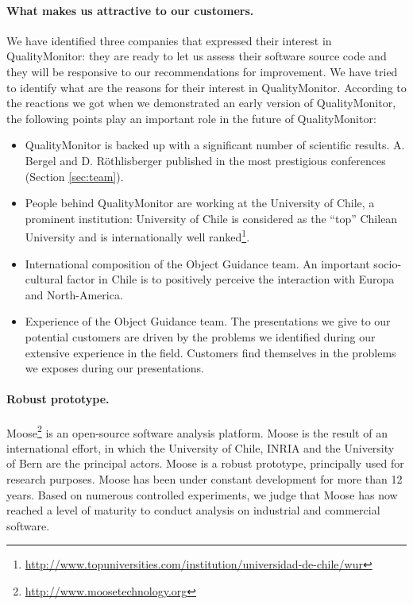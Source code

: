 \documentclass[runningheads]{llncs}
\newcommand{\secref}[1]{Section \ref{sec:#1}}
\begin{document}
\paragraph{What makes us attractive to our customers. }
We have identified three companies that expressed their interest in QualityMonitor: they are ready to let us assess their software source code and they will be responsive to our recommendations for improvement. 
We have tried to identify what are the reasons for their interest in QualityMonitor. According to the reactions we got when we demonstrated an early version of QualityMonitor, the following points play an important role in the future of QualityMonitor:
\begin{itemize}
\item QualityMonitor is backed up with a significant number of scientific results. A. Bergel and D. R\"othlisberger published in the most prestigious conferences (\secref{team}).
\item People behind QualityMonitor are working at the University of Chile, a prominent institution: University of Chile is considered as the ``top'' Chilean University and is internationally well ranked\footnote{\url{http://www.topuniversities.com/institution/universidad-de-chile/wur}}.
\item International composition of the Object Guidance team. An important socio-cultural factor in Chile is to positively perceive the interaction with Europa and North-America.
\item Experience of the Object Guidance team. The presentations we give to our potential customers are driven by the problems we identified during our extensive experience in the field. Customers find themselves in the problems we exposes during our presentations.
\end{itemize}


\paragraph{Robust prototype.}
Moose\footnote{\url{http://www.moosetechnology.org}} is an open-source software analysis platform. Moose is the result of an international effort, in which the University of Chile, INRIA and the University of Bern are the principal actors. Moose is a robust prototype, principally used for research purposes. Moose has been under constant development for more than 12 years. Based on numerous controlled experiments, we judge that Moose has now reached a level of maturity to conduct analysis on industrial and commercial software. 
\end{document}
